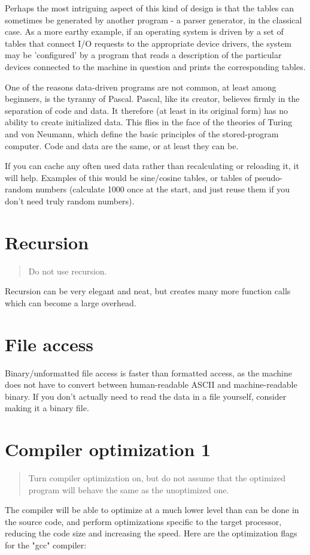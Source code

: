 \documentclass{report}
\begin{document}
Perhaps the most intriguing aspect of this kind of design is that the tables can sometimes be generated by another program - a parser generator, in the classical case. 
As a more earthy example, if an operating system is driven by a set of tables that connect I/O requests to the appropriate device drivers, the system may be 'configured' by a program that reads a description of the particular devices connected to the machine in question and prints the corresponding tables.

One of the reasons data-driven programs are not common, at least among beginners, is the tyranny of Pascal. Pascal, like its creator, believes firmly in the separation of code and data. It therefore (at least in its original form) has no ability to create initialized data. This flies in the face of the theories of Turing and von Neumann, which define the basic principles of the stored-program computer. Code and data are the same, or at least they can be.

If you can cache any often used data rather than recalculating or reloading it, it will help. Examples of this would be sine/cosine tables, or tables of pseudo-random numbers (calculate 1000 once at the start, and just reuse them if you don't need truly random numbers).

\section{Recursion}
\begin{quote}
Do not use recursion.
\end{quote}
Recursion can be very elegant and neat, but creates many more function calls which can become a large overhead. 

\section{File access}
Binary/unformatted file access is faster than formatted access, as the machine does not have to convert between human-readable ASCII and machine-readable binary. If you don't actually need to read the data in a file yourself, consider making it a binary file. 


\section{Compiler optimization 1}
\begin{quote}
Turn compiler optimization on, but do not assume that the optimized program will behave the same as the unoptimized one.
\end{quote}
The compiler will be able to optimize at a much lower level than can be done in the source code, and perform optimizations specific to the target processor, reducing the code size and increasing the speed.
Here are the optimization flags for the "gcc" compiler:
\newline
\end{document}
